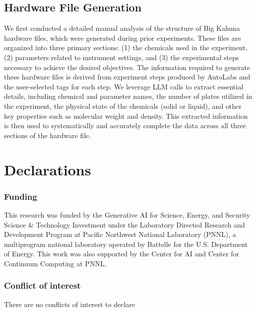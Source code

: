 \documentclass[sn-nature, twocolumn]{sn-jnl}%
\theoremstyle{thmstyleone}%
\theoremstyle{thmstyletwo}%
\theoremstyle{thmstylethree}%
\begin{document}
\subsection{Hardware File Generation}

We first conducted a detailed manual analysis of the structure of Big Kahuna hardware files, which were generated during prior experiments. These files are organized into three primary sections: (1) the chemicals used in the experiment, (2) parameters related to instrument settings, and (3) the experimental steps necessary to achieve the desired objectives.
The information required to generate these hardware files is derived from experiment steps produced by AutoLabs and the user-selected tags for each step. We leverage LLM calls to extract essential details, including chemical and parameter names, the number of plates utilized in the experiment, the physical state of the chemicals (solid or liquid), and other key properties such as molecular weight and density. This extracted information is then used to systematically and accurately complete the data across all three sections of the hardware file.


\section*{Declarations}


\subsubsection*{Funding}
This research was funded by the Generative AI for Science, Energy, and Security Science \& Technology Investment under the Laboratory Directed Research and Development Program at Pacific Northwest National Laboratory (PNNL), a multiprogram national laboratory operated by Battelle for the U.S. Department of Energy. This work was also supported by the Center for AI and Center for Continuum Computing at PNNL. 

\subsubsection*{Conflict of interest}
There are no conflicts of interest to declare
\end{document}
